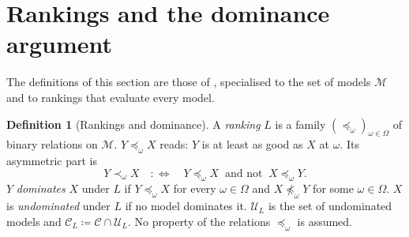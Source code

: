 \documentclass[11pt]{article}
\theoremstyle{definition}
\newtheorem{definition}[theorem]{Definition}
\newcommand{\M}{\mathcal M}
\newcommand{\C}{\mathcal C}
\newcommand{\U}{\mathcal U}
\begin{document}
\section{Rankings and the dominance argument}\label{sec:ldg}

The definitions of this section are those of \cite{LDG}, specialised to the set of models $\M$ and to rankings that evaluate every model.

\begin{definition}[Rankings and dominance]\label{def:rankings}
A \emph{ranking} $L$ is a family $(\preceq_\omega)_{\omega\in\Omega}$ of binary relations on $\M$. $Y\preceq_\omega X$ reads: $Y$ is at least as good as $X$ at $\omega$. Its asymmetric part is
\[
Y\prec_\omega X\quad:\Longleftrightarrow\quad Y\preceq_\omega X\ \text{ and not }\ X\preceq_\omega Y .
\]
$Y$ \emph{dominates} $X$ under $L$ if $Y\preceq_\omega X$ for every $\omega\in\Omega$ and $X\not\preceq_\omega Y$ for some $\omega\in\Omega$. $X$ is \emph{undominated} under $L$ if no model dominates it. $\U_L$ is the set of undominated models and $\C_L\coloneqq\C\cap\U_L$. No property of the relations $\preceq_\omega$ is assumed.
\end{definition}
\end{document}
